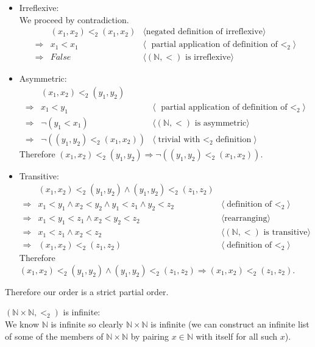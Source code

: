 \documentclass[11pt,fleqn]{article}
\newcommand{\bi}{\begin{itemize}}
\newcommand{\ei}{\end{itemize}}
\newcommand{\pnote}[1]{{\langle \text{#1} \rangle}}
\begin{document}
		\bi
			\item Irreflexive: \\
				We proceed by contradiction.
				\begin{align*}
					&(x_1, x_2) <_2 (x_1, x_2) & \pnote{negated definition of irreflexive} \\
					\Rightarrow & x_1 < x_1 & \pnote{ partial application of definition of $<_2$} \\
					\Rightarrow & False & \pnote{$(\mathbb{N}, <)$ is irreflexive}
				\end{align*}
			\item Asymmetric: \\
				\begin{align*}
					&(x_1, x_2) <_2 (y_1, y_2) & \\
					\Rightarrow & x_1 < y_1 & \pnote{ partial application of definition of $<_2$} \\
					\Rightarrow & \neg{}(y_1 < x_1) & \pnote{$(\mathbb{N}, <)$ is asymmetric} \\
					\Rightarrow & \neg{}((y_1, y_2) <_2 (x_1, x_2)) & \pnote{trivial with $<_2$ definition}
				\end{align*}
				Therefore $(x_1, x_2) <_2 (y_1, y_2) \Rightarrow \neg{}((y_1, y_2) <_2 (x_1, x_2))$.
			\item Transitive: \\
				\begin{align*}
				&(x_1, x_2) <_2 (y_1, y_2) \wedge (y_1, y_2) <_2 (z_1, z_2) & \\
				\Rightarrow & x_1 < y_1 \wedge x_2 < y_2 \wedge y_1 < z_1 \wedge y_2 < z_2 & \pnote{definition of $<_2$} \\
				\Rightarrow &  x_1 < y_1 < z_1 \wedge x_2 < y_2 < z_2 & \pnote{rearranging} \\
				\Rightarrow &  x_1 < z_1 \wedge x_2 < z_2 & \pnote{$(\mathbb{N}, <)$ is transitive} \\
				\Rightarrow & (x_1, x_2) <_2 (z_1, z_2) & \pnote{definition of $<_2$}
				\end{align*}
				Therefore $(x_1, x_2) <_2 (y_1, y_2) \wedge (y_1, y_2) <_2 (z_1, z_2) \Rightarrow (x_1, x_2) <_2 (z_1, z_2)$.
		\ei
		Therefore our order is a strict partial order.
	
	\item $(\mathbb{N} \times \mathbb{N}, <_2)$ is infinite: \\
	We know $\mathbb{N}$ is infinite so clearly $\mathbb{N} \times \mathbb{N}$ is infinite (we can construct an infinite list of some of the members of $\mathbb{N} \times \mathbb{N}$ by pairing $x\in \mathbb{N}$ with itself for all such $x$).
	
\end{document}
